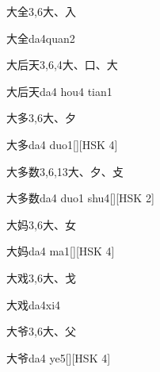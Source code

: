 \begin{entry}{大全}{3,6}{⼤、⼊}
  \begin{phonetics}{大全}{da4quan2}
  \end{phonetics}
\end{entry}

\begin{entry}{大后天}{3,6,4}{⼤、⼝、⼤}
  \begin{phonetics}{大后天}{da4 hou4 tian1}
  \end{phonetics}
\end{entry}

\begin{entry}{大多}{3,6}{⼤、⼣}
  \begin{phonetics}{大多}{da4 duo1}[][HSK 4]
  \end{phonetics}
\end{entry}

\begin{entry}{大多数}{3,6,13}{⼤、⼣、⽁}
  \begin{phonetics}{大多数}{da4 duo1 shu4}[][HSK 2]
  \end{phonetics}
\end{entry}

\begin{entry}{大妈}{3,6}{⼤、⼥}
  \begin{phonetics}{大妈}{da4 ma1}[][HSK 4]
  \end{phonetics}
\end{entry}

\begin{entry}{大戏}{3,6}{⼤、⼽}
  \begin{phonetics}{大戏}{da4xi4}
  \end{phonetics}
\end{entry}

\begin{entry}{大爷}{3,6}{⼤、⽗}
  \begin{phonetics}{大爷}{da4 ye5}[][HSK 4]
  \end{phonetics}
\end{entry}

